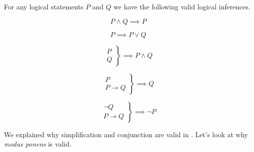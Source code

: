 \begin{thm}
\label{thm_logical_infer}
   For any logical statements $P$ and $Q$ we have the following valid logical inferences.
   \begin{apart}
        \item \label{part_thm_infer_simp}  $$P \land Q \implies P$$
        \item \label{part_thm_infer_add}  $$P \implies P \lor Q$$
        \item \label{part_thm_infer_conj}  $$\left. \begin{array} {cc} P \\ Q \end{array} \right\} \implies P \land Q$$
        \item \label{part_thm_infer_mp} 
        $$\left. \begin{array} {cc} P  \\P  \to Q\end{array} \right\} \implies Q$$
        \item \label{part_thm_infer_mt} 
        $$\left. \begin{array} {cc} \neg Q \\ P \to Q \end{array} \right\} \implies \neg P$$
    \end{apart}
\end{thm}

We explained why simplification and conjunction are valid in .  Let's look at why \emph{modus ponens} is valid.

